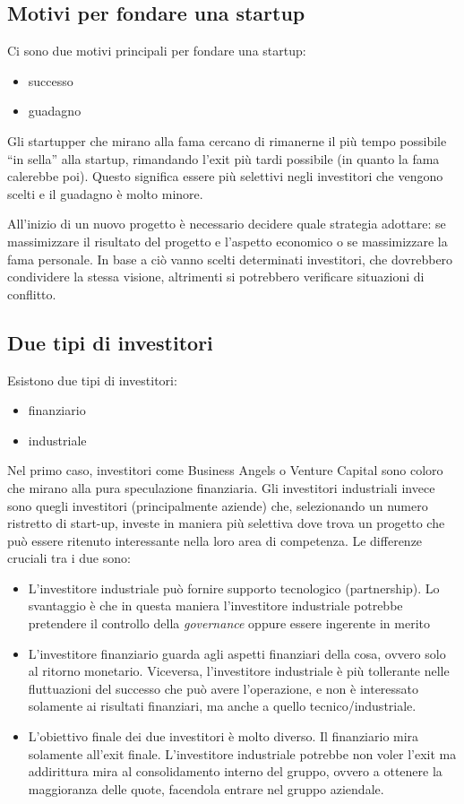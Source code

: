 \subsection{Motivi per fondare una startup}
Ci sono due motivi principali per fondare una startup:
\begin{itemize}
 \item successo
 \item guadagno
\end{itemize}

Gli startupper che mirano alla fama cercano di rimanerne il più tempo possibile
``in sella'' alla startup, rimandando l'exit più tardi possibile (in quanto la
fama calerebbe poi). Questo significa essere più selettivi negli investitori
che vengono scelti e il guadagno è molto minore.

All'inizio di un nuovo progetto è necessario decidere quale strategia adottare:
se massimizzare il risultato del progetto e l'aspetto economico o se
massimizzare la fama personale. In base a ciò vanno scelti determinati
investitori, che dovrebbero condividere la stessa visione, altrimenti si
potrebbero verificare situazioni di conflitto.

\subsection{Due tipi di investitori}

Esistono due tipi di investitori:
\begin{itemize}
 \item finanziario
 \item industriale
\end{itemize}
Nel primo caso, investitori come Business Angels o Venture Capital sono coloro
che mirano alla pura speculazione finanziaria. Gli investitori industriali
invece sono quegli investitori (principalmente aziende) che, selezionando un
numero ristretto di start-up, investe in maniera più selettiva dove trova un
progetto che può essere ritenuto interessante nella loro area di competenza.
Le differenze cruciali tra i due sono:
\begin{itemize}
 \item L'investitore industriale può fornire supporto tecnologico
(partnership). Lo svantaggio è che in questa maniera l'investitore industriale
potrebbe pretendere il controllo della \textit{governance} oppure essere
ingerente in merito
 \item L'investitore finanziario guarda agli aspetti finanziari della cosa,
ovvero solo al ritorno monetario. Viceversa, l'investitore industriale è più
tollerante nelle fluttuazioni del successo che può avere l'operazione, e non è
interessato solamente ai risultati finanziari, ma anche a quello
tecnico/industriale.
 \item L'obiettivo finale dei due investitori è molto diverso. Il finanziario
mira solamente all'exit finale. L'investitore industriale potrebbe non voler
l'exit ma addirittura mira al consolidamento interno del gruppo, ovvero
a ottenere la maggioranza delle quote, facendola entrare nel gruppo aziendale.
\end{itemize}

